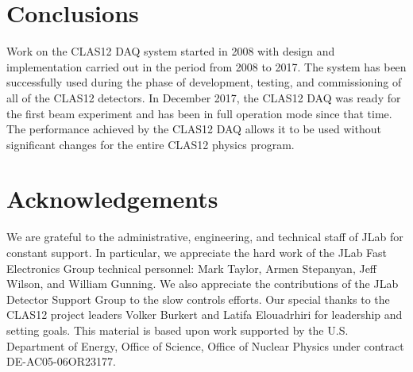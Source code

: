 \section{Conclusions}

Work on the CLAS12 DAQ system started in 2008 with design and implementation carried out in the period from 
2008 to 2017. The system has been successfully used during the phase of development, testing, and commissioning of all
of the CLAS12 detectors. In December 2017, the CLAS12 DAQ was ready for the first beam experiment and has been
in full operation mode since that time. The performance achieved by the CLAS12 DAQ allows it to be used without
significant changes for the entire CLAS12 physics program.

\section{Acknowledgements}

We are grateful to the administrative, engineering, and technical staff of JLab for constant support. In particular, we
appreciate the hard work of the JLab Fast Electronics Group technical personnel:  Mark Taylor, Armen Stepanyan, Jeff
Wilson, and William Gunning.  We also appreciate the contributions of the JLab Detector Support Group to the slow
controls efforts.  Our special thanks to the CLAS12 project leaders Volker Burkert and Latifa Elouadrhiri for leadership
and setting goals. This material is based upon work supported by the U.S. Department of Energy, Office of Science,
Office of Nuclear Physics under contract DE-AC05-06OR23177.

